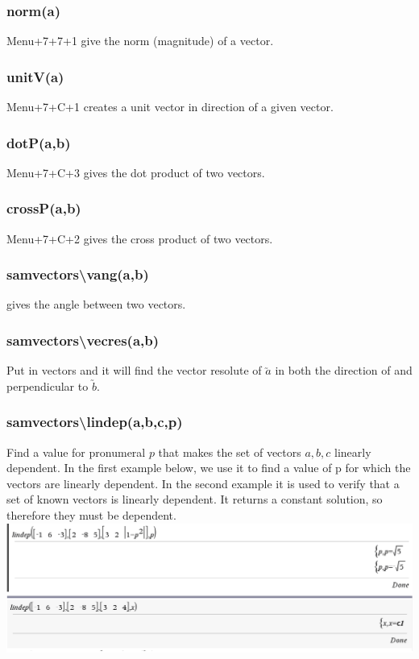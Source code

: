 \documentclass[a4paper,twoside,10pt]{article}
\begin{document}
			\subsubsection{norm(a)} Menu+7+7+1 give the norm (magnitude) of a vector.
			\subsubsection{unitV(a)} Menu+7+C+1 creates a unit vector in direction of a given vector.
			\subsubsection{dotP(a,b)} Menu+7+C+3 gives the dot product of two vectors.
			\subsubsection{crossP(a,b)} Menu+7+C+2 gives the cross product of two vectors.
			\subsubsection{sam\textunderscore vectors\textbackslash vang(a,b)} gives the angle between two vectors.
			\subsubsection{sam\textunderscore vectors\textbackslash vecres(a,b)} Put in vectors and it will find the vector resolute of $\utilde{a}$ in both the direction of and perpendicular to $\utilde{b}$.
			\subsubsection{sam\textunderscore vectors\textbackslash lindep(a,b,c,p)} Find a value for pronumeral $p$ that makes the set of vectors $a,b,c$ linearly dependent. In the first example below, we use it to find a value of p for which the vectors are linearly dependent. In the second example it is used to verify that a set of known vectors is linearly dependent. It returns a constant solution, so therefore they must be dependent.\\
			\includegraphics[width=18cm]{lindepcas.png}
\end{document}
